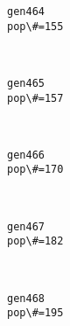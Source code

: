 \documentclass[11pt]{article}
\begin{document}
    \begin{Verbatim}[commandchars=\\\{\}]
gen464
pop\#=155

    \end{Verbatim}

    \begin{center}
    \end{center}
    { \hspace*{\fill} \\}
    
    \begin{Verbatim}[commandchars=\\\{\}]
gen465
pop\#=157

    \end{Verbatim}

    \begin{center}
    \end{center}
    { \hspace*{\fill} \\}
    
    \begin{Verbatim}[commandchars=\\\{\}]
gen466
pop\#=170

    \end{Verbatim}

    \begin{center}
    \end{center}
    { \hspace*{\fill} \\}
    
    \begin{Verbatim}[commandchars=\\\{\}]
gen467
pop\#=182

    \end{Verbatim}

    \begin{center}
    \end{center}
    { \hspace*{\fill} \\}
    
    \begin{Verbatim}[commandchars=\\\{\}]
gen468
pop\#=195

    \end{Verbatim}
\end{document}
